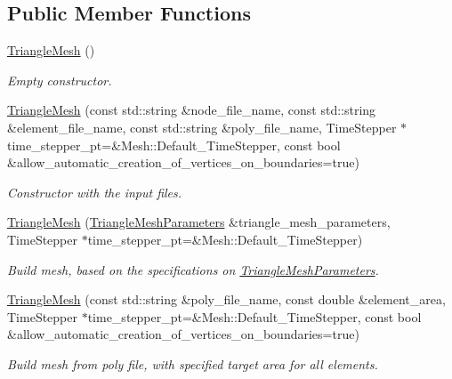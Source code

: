\subsection*{Public Member Functions}
\begin{DoxyCompactItemize}
\item 
\hyperlink{classoomph_1_1TriangleMesh_aec6b165889c9e65820d74837c237b7c7}{Triangle\+Mesh} ()
\begin{DoxyCompactList}\small\item\em Empty constructor. \end{DoxyCompactList}\item 
\hyperlink{classoomph_1_1TriangleMesh_acb4a658f29866da64cfd31daa98827dc}{Triangle\+Mesh} (const std\+::string \&node\+\_\+file\+\_\+name, const std\+::string \&element\+\_\+file\+\_\+name, const std\+::string \&poly\+\_\+file\+\_\+name, Time\+Stepper $\ast$time\+\_\+stepper\+\_\+pt=\&Mesh\+::\+Default\+\_\+\+Time\+Stepper, const bool \&allow\+\_\+automatic\+\_\+creation\+\_\+of\+\_\+vertices\+\_\+on\+\_\+boundaries=true)
\begin{DoxyCompactList}\small\item\em Constructor with the input files. \end{DoxyCompactList}\item 
\hyperlink{classoomph_1_1TriangleMesh_a9178e41a6f4af03bbb6b304ac3c201aa}{Triangle\+Mesh} (\hyperlink{classoomph_1_1TriangleMeshParameters}{Triangle\+Mesh\+Parameters} \&triangle\+\_\+mesh\+\_\+parameters, Time\+Stepper $\ast$time\+\_\+stepper\+\_\+pt=\&Mesh\+::\+Default\+\_\+\+Time\+Stepper)
\begin{DoxyCompactList}\small\item\em Build mesh, based on the specifications on \hyperlink{classoomph_1_1TriangleMeshParameters}{Triangle\+Mesh\+Parameters}. \end{DoxyCompactList}\item 
\hyperlink{classoomph_1_1TriangleMesh_aa0346dc3c88395c949f2e2c0209aea39}{Triangle\+Mesh} (const std\+::string \&poly\+\_\+file\+\_\+name, const double \&element\+\_\+area, Time\+Stepper $\ast$time\+\_\+stepper\+\_\+pt=\&Mesh\+::\+Default\+\_\+\+Time\+Stepper, const bool \&allow\+\_\+automatic\+\_\+creation\+\_\+of\+\_\+vertices\+\_\+on\+\_\+boundaries=true)
\begin{DoxyCompactList}\small\item\em Build mesh from poly file, with specified target area for all elements. \end{DoxyCompactList}\item 

\end{DoxyCompactItemize}
